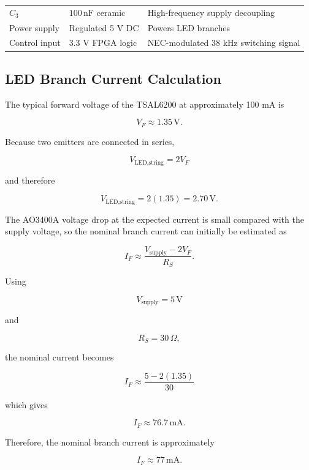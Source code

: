 \documentclass[a4paper,12pt]{article}
\begin{document}
\begin{table}[H]
\begin{tabular}{@{}p{3.1cm}p{4.1cm}p{5.7cm}@{}}
        \(C_3\) &
        \(100\,\text{nF}\) ceramic &
        High-frequency supply decoupling \\

        Power supply &
        Regulated 5 V DC &
        Powers LED branches \\

        Control input &
        3.3 V FPGA logic &
        NEC-modulated 38 kHz switching signal \\

        \bottomrule
    \end{tabular}

\end{table}



\subsection{LED Branch Current Calculation}

The typical forward voltage of the TSAL6200 at approximately 100 mA is

\[
V_F \approx 1.35\,\text{V}.
\]

Because two emitters are connected in series,

\[
V_{\text{LED,string}}
=
2V_F
\]

and therefore

\[
V_{\text{LED,string}}
=
2(1.35)
=
2.70\,\text{V}.
\]

The AO3400A voltage drop at the expected current is small compared with
the supply voltage, so the nominal branch current can initially be
estimated as

\[
I_F
\approx
\frac{
V_{\text{supply}} - 2V_F
}{
R_S
}.
\]

Using

\[
V_{\text{supply}}=5\,\text{V}
\]

and

\[
R_S=30\,\Omega,
\]

the nominal current becomes

\[
I_F
\approx
\frac{
5 - 2(1.35)
}{
30
}
\]

which gives

\[
I_F
\approx
76.7\,\text{mA}.
\]

Therefore, the nominal branch current is approximately

\[
\boxed{
I_F \approx 77\,\text{mA}
}.
\]
\end{document}
